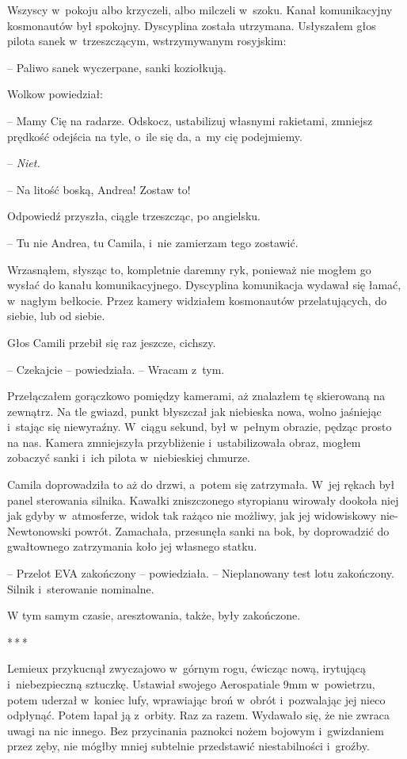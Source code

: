 \documentclass[oneside,polish,12pt,sfheadings]{mwbk}
\newcommand{\threeast}{\bigskip\par\centerline{*\,*\,*}\medskip\par}%
\begin{document}
Wszyscy w~pokoju albo krzyczeli, albo milczeli w~szoku. Kanał
komunikacyjny kosmonautów był spokojny. Dyscyplina została utrzymana.
Usłyszałem głos pilota sanek w~trzeszczącym, wstrzymywanym rosyjskim:

-- Paliwo sanek wyczerpane, sanki koziołkują.

Wolkow powiedział: 

-- Mamy Cię na radarze. Odskocz, ustabilizuj własnymi
rakietami, zmniejsz prędkość odejścia na tyle, o~ile się da, a~my cię
podejmiemy.

-- \emph{Niet.}

-- Na litość boską, Andrea! Zostaw to!

Odpowiedź przyszła, ciągle trzeszcząc, po angielsku.

-- Tu nie Andrea, tu Camila, i~nie zamierzam tego zostawić.

Wrzasnąłem, słysząc to, kompletnie daremny ryk, ponieważ nie mogłem go
wysłać do kanału komunikacyjnego. Dyscyplina komunikacja wydawał się
łamać, w~nagłym bełkocie. Przez kamery widziałem kosmonautów
przelatujących, do siebie, lub od siebie.

Głos Camili przebił się raz jeszcze, cichszy.

-- Czekajcie -- powiedziała. -- Wracam z~tym.

Przełączałem gorączkowo pomiędzy kamerami, aż znalazłem tę skierowaną na
zewnątrz. Na tle gwiazd, punkt błyszczał jak niebieska nowa, wolno
jaśniejąc i~stając się niewyraźny. W~ciągu sekund, był w~pełnym obrazie,
pędząc prosto na nas. Kamera zmniejszyła przybliżenie i~ustabilizowała
obraz, mogłem zobaczyć sanki i~ich pilota w~niebieskiej chmurze.

Camila doprowadziła to aż do drzwi, a~potem się zatrzymała. W~jej rękach
był panel sterowania silnika. Kawałki zniszczonego styropianu wirowały
dookoła niej jak gdyby w~atmosferze, widok tak rażąco nie możliwy, jak
jej widowiskowy nie-Newtonowski powrót. Zamachała, przesunęła sanki na
bok, by doprowadzić do gwałtownego zatrzymania koło jej własnego statku.

-- Przelot EVA zakończony -- powiedziała. -- Nieplanowany test lotu
zakończony. Silnik i~sterowanie nominalne.

W tym samym czasie, aresztowania, także, były zakończone.

\threeast


Lemieux przykucnął zwyczajowo w~górnym rogu, ćwicząc nową, irytującą i~niebezpieczną sztuczkę. Ustawiał swojego Aerospatiale 9mm w~powietrzu,
potem uderzał w~koniec lufy, wprawiając broń w~obrót i~pozwalając jej
nieco odpłynąć. Potem łapał ją z~orbity. Raz za razem. Wydawało się, że
nie zwraca uwagi na nic innego. Bez przycinania paznokci nożem bojowym i~gwizdaniem przez zęby, nie mógłby mniej subtelnie przedstawić
niestabilności i~groźby.
\end{document}
